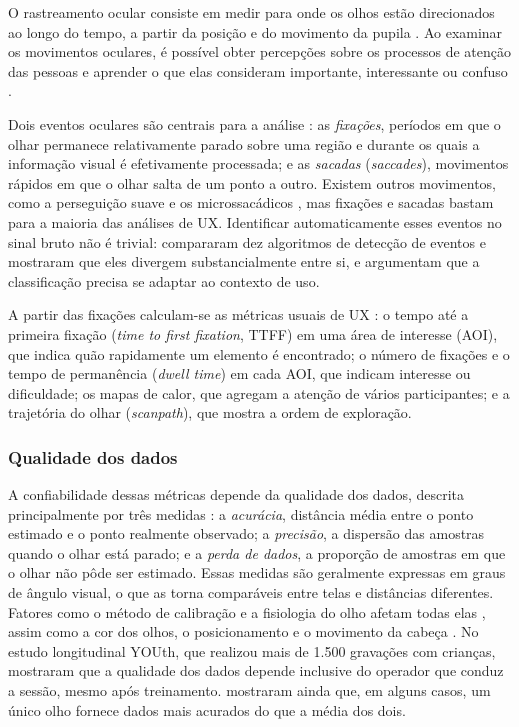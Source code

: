 \documentclass[sigconf, nonacm, language=english, language=portuguese, natbib=false]{acmart}
\begin{document}
O rastreamento ocular consiste em medir para onde os olhos estão direcionados ao longo do tempo, a partir da posição e do movimento da pupila \cite{holmqvist2011eye, duchowski2017eye}. Ao examinar os movimentos oculares, é possível obter percepções sobre os processos de atenção das pessoas e aprender o que elas consideram importante, interessante ou confuso \cite{bojko2005eye}.

Dois eventos oculares são centrais para a análise \cite{salvucci2000identifying}: as \emph{fixações}, períodos em que o olhar permanece relativamente parado sobre uma região e durante os quais a informação visual é efetivamente processada; e as \emph{sacadas} (\emph{saccades}), movimentos rápidos em que o olhar salta de um ponto a outro. Existem outros movimentos, como a perseguição suave e os microssacádicos \cite{duchowski2017eye}, mas fixações e sacadas bastam para a maioria das análises de UX. Identificar automaticamente esses eventos no sinal bruto não é trivial: \textcite{andersson2017} compararam dez algoritmos de detecção de eventos e mostraram que eles divergem substancialmente entre si, e \textcite{braunagel2016} argumentam que a classificação precisa se adaptar ao contexto de uso.

A partir das fixações calculam-se as métricas usuais de UX \cite{holmqvist2011eye, bojko2005eye}: o tempo até a primeira fixação (\emph{time to first fixation}, TTFF) em uma área de interesse (AOI), que indica quão rapidamente um elemento é encontrado; o número de fixações e o tempo de permanência (\emph{dwell time}) em cada AOI, que indicam interesse ou dificuldade; os mapas de calor, que agregam a atenção de vários participantes; e a trajetória do olhar (\emph{scanpath}), que mostra a ordem de exploração.

\subsubsection{Qualidade dos dados}
A confiabilidade dessas métricas depende da qualidade dos dados, descrita principalmente por três medidas \cite{holmqvist2012quality}: a \emph{acurácia}, distância média entre o ponto estimado e o ponto realmente observado; a \emph{precisão}, a dispersão das amostras quando o olhar está parado; e a \emph{perda de dados}, a proporção de amostras em que o olhar não pôde ser estimado. Essas medidas são geralmente expressas em graus de ângulo visual, o que as torna comparáveis entre telas e distâncias diferentes. Fatores como o método de calibração e a fisiologia do olho afetam todas elas \cite{nystrom2013}, assim como a cor dos olhos, o posicionamento e o movimento da cabeça \cite{hessels2015}. No estudo longitudinal YOUth, que realizou mais de 1.500 gravações com crianças, \textcite{hessels2019youth} mostraram que a qualidade dos dados depende inclusive do operador que conduz a sessão, mesmo após treinamento. \textcite{hooge2019} mostraram ainda que, em alguns casos, um único olho fornece dados mais acurados do que a média dos dois.
\end{document}
